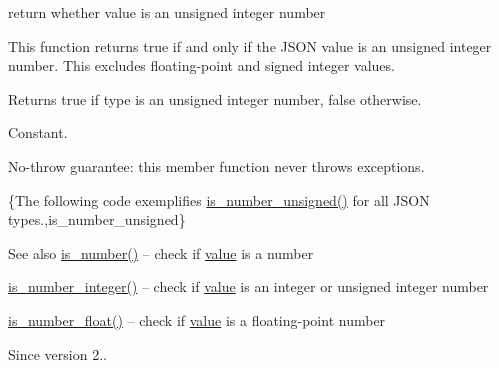 return whether value is an unsigned integer number 

This function returns true if and only if the J\+S\+ON value is an unsigned integer number. This excludes floating-\/point and signed integer values.

\begin{DoxyReturn}{Returns}
{\ttfamily true} if type is an unsigned integer number, {\ttfamily false} otherwise.
\end{DoxyReturn}
Constant.

No-\/throw guarantee\+: this member function never throws exceptions.

\{The following code exemplifies {\ttfamily \hyperlink{classnlohmann_1_1basic__json_abc7378cba0613a78b9aad1c8e7044bb0}{is\+\_\+number\+\_\+unsigned()}} for all J\+S\+ON types.,is\+\_\+number\+\_\+unsigned\}

\begin{DoxySeeAlso}{See also}
\hyperlink{classnlohmann_1_1basic__json_a2b9852390abb4b1ef5fac6984e2fc0f3}{is\+\_\+number()} -- check if \hyperlink{classnlohmann_1_1basic__json_a404017aa52714a0a4bc79d5af7e4ad2b}{value} is a number 

\hyperlink{classnlohmann_1_1basic__json_abac8af76067f1e8fdca9052882c74428}{is\+\_\+number\+\_\+integer()} -- check if \hyperlink{classnlohmann_1_1basic__json_a404017aa52714a0a4bc79d5af7e4ad2b}{value} is an integer or unsigned integer number 

\hyperlink{classnlohmann_1_1basic__json_a33b4bf898b857c962e798fc7f6e86e70}{is\+\_\+number\+\_\+float()} -- check if \hyperlink{classnlohmann_1_1basic__json_a404017aa52714a0a4bc79d5af7e4ad2b}{value} is a floating-\/point number
\end{DoxySeeAlso}
\begin{DoxySince}{Since}
version 2.. 
\end{DoxySince}
